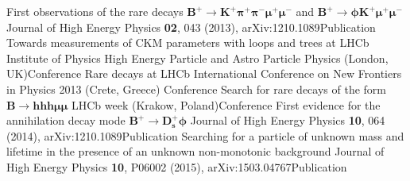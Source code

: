 {First observations of the rare decays
  $\boldsymbol{B^+\!\to K^+\pi^+\pi^-\mu^+\mu^-}$ and
  $\boldsymbol{B^+\!\to\phi K^+\mu^+\mu^-}$}
  {Journal of High Energy Physics \textbf{02}, 043 (2013), arXiv:1210.1089}{Publication}
{Towards measurements of CKM parameters with loops and trees at LHCb}
{Institute of Physics High Energy Particle and Astro Particle
Physics (London, UK)}{Conference}
{Rare decays at LHCb}
{International Conference on New Frontiers in Physics 2013 (Crete, Greece)}
{Conference}
{Search for rare decays of the form $\boldsymbol{B\to hhh\mu\mu}$}
{LHCb week (Krakow, Poland)}{Conference}
{First evidence for the annihilation decay mode $\boldsymbol{B^+\!\to D_s^+\phi}$}
{Journal of High Energy Physics \textbf{10}, 064 (2014), arXiv:1210.1089}{Publication}
{Searching for a particle of unknown mass and lifetime in the presence of an
 \n unknown non-monotonic background}
{Journal of High Energy Physics \textbf{10}, P06002 (2015), arXiv:1503.04767}{Publication}








